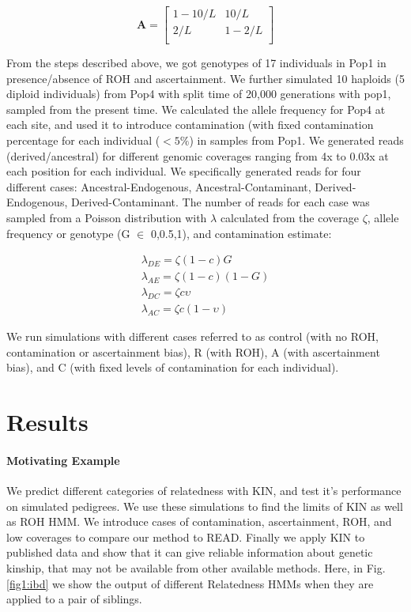 \documentclass[12pt, letterpaper]{article}
\begin{document}
$$\mathbf{A} = \left[\begin{array}
{rr}
1-10/L & 10/L \\
2/L & 1-2/L  \\
\end{array}\right]
$$

From the steps described above, we got genotypes of 17 individuals in Pop1 in presence/absence of ROH and ascertainment. We further simulated 10 haploids (5 diploid individuals) from Pop4 with split time of 20,000 generations with pop1, sampled from the present time. We calculated the allele frequency for Pop4 at each site, and used it to introduce contamination (with fixed contamination percentage for each individual ($<5\%$) in samples from Pop1. We generated reads (derived/ancestral) for different genomic coverages ranging from 4x to 0.03x at each position for each individual. We specifically generated reads for four different cases: Ancestral-Endogenous, Ancestral-Contaminant, Derived-Endogenous, Derived-Contaminant. The number of reads for each case was sampled from a Poisson distribution with $\lambda$ calculated from the coverage $\zeta$, allele frequency or genotype (G $\in$ 0,0.5,1), and contamination estimate:

\begin{align}
    \lambda_{DE} = \zeta (1-c) G\nonumber\\
    \lambda_{AE} = \zeta (1-c) (1-G)\nonumber\\
    \lambda_{DC} = \zeta c \upsilon\nonumber\\
    \lambda_{AC} = \zeta c (1-\upsilon)
\end{align}

We run simulations with different cases referred to as control (with no ROH, contamination or ascertainment bias), R (with ROH), A (with ascertainment bias), and C (with fixed levels of contamination for each individual). 


\section{Results}


\paragraph{Motivating Example}
We predict different categories of relatedness with KIN, and test it's performance on simulated pedigrees. We use these simulations to find the limits of KIN as well as ROH HMM. We introduce cases of contamination, ascertainment, ROH, and low coverages to compare our method to READ. Finally we apply KIN to published data and show that it can give reliable information about genetic kinship, that may not be available from other available methods. Here, in Fig.\ref{fig1:ibd} we show the output of different Relatedness HMMs when they are applied to a pair of siblings.
\end{document}
